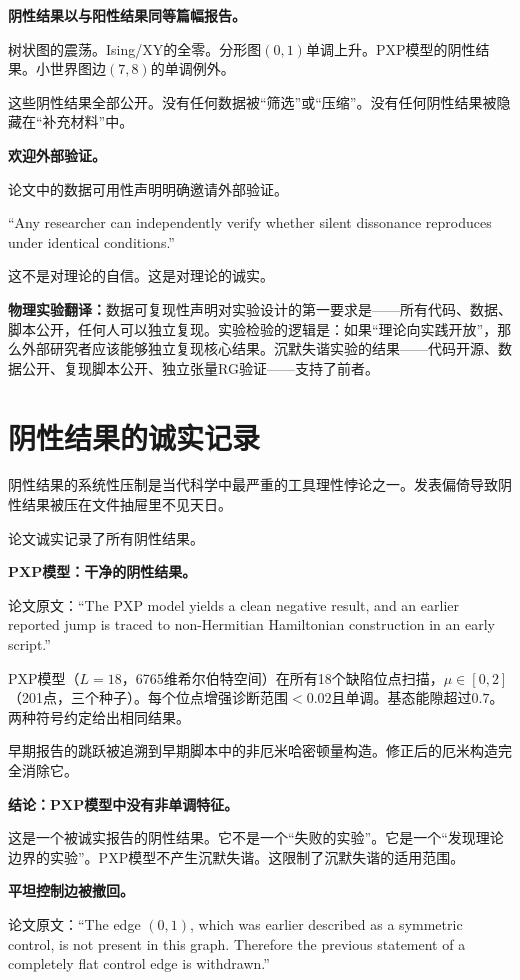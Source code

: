 \documentclass[11pt,a4paper]{book}
\theoremstyle{definition}
\begin{document}
\textbf{阴性结果以与阳性结果同等篇幅报告。}

树状图的震荡。Ising/XY的全零。分形图$(0,1)$单调上升。PXP模型的阴性结果。小世界图边$(7,8)$的单调例外。

这些阴性结果全部公开。没有任何数据被“筛选”或“压缩”。没有任何阴性结果被隐藏在“补充材料”中。

\textbf{欢迎外部验证。}

论文中的数据可用性声明明确邀请外部验证。

“Any researcher can independently verify whether silent dissonance reproduces under identical conditions.”

这不是对理论的自信。这是对理论的诚实。

\textbf{物理实验翻译：}数据可复现性声明对实验设计的第一要求是——所有代码、数据、脚本公开，任何人可以独立复现。实验检验的逻辑是：如果“理论向实践开放”，那么外部研究者应该能够独立复现核心结果。沉默失谐实验的结果——代码开源、数据公开、复现脚本公开、独立张量RG验证——支持了前者。

\section{阴性结果的诚实记录}

阴性结果的系统性压制是当代科学中最严重的工具理性悖论之一。发表偏倚导致阴性结果被压在文件抽屉里不见天日。

论文诚实记录了所有阴性结果。

\textbf{PXP模型：干净的阴性结果。}

论文原文：“The PXP model yields a clean negative result, and an earlier reported jump is traced to non-Hermitian Hamiltonian construction in an early script.”

PXP模型（$L=18$，6765维希尔伯特空间）在所有18个缺陷位点扫描，$\mu\in[0,2]$（201点，三个种子）。每个位点增强诊断范围$<0.02$且单调。基态能隙超过$0.7$。两种符号约定给出相同结果。

早期报告的跳跃被追溯到早期脚本中的非厄米哈密顿量构造。修正后的厄米构造完全消除它。

\textbf{结论：PXP模型中没有非单调特征。}

这是一个被诚实报告的阴性结果。它不是一个“失败的实验”。它是一个“发现理论边界的实验”。PXP模型不产生沉默失谐。这限制了沉默失谐的适用范围。

\textbf{平坦控制边被撤回。}

论文原文：“The edge $(0,1)$, which was earlier described as a symmetric control, is not present in this graph. Therefore the previous statement of a completely flat control edge is withdrawn.”
\end{document}
